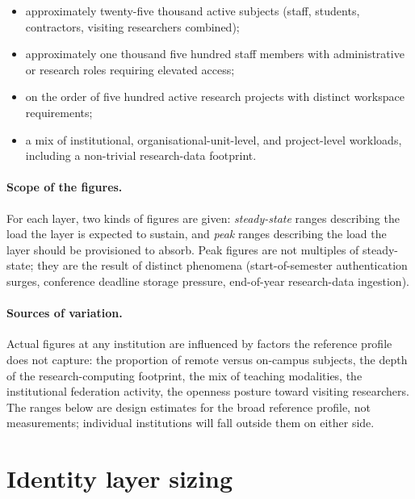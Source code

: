 \begin{itemize}[leftmargin=1.5em,nosep]
  \item approximately twenty-five thousand active subjects (staff,
    students, contractors, visiting researchers combined);
  \item approximately one thousand five hundred staff members with
    administrative or research roles requiring elevated access;
  \item on the order of five hundred active research projects with
    distinct workspace requirements;
  \item a mix of institutional, organisational-unit-level, and
    project-level workloads, including a non-trivial research-data
    footprint.
\end{itemize}

\paragraph{Scope of the figures.} For each layer, two kinds of
figures are given: \emph{steady-state} ranges describing the load
the layer is expected to sustain, and \emph{peak} ranges describing
the load the layer should be provisioned to absorb. Peak figures are
not multiples of steady-state; they are the result of distinct
phenomena (start-of-semester authentication surges, conference
deadline storage pressure, end-of-year research-data ingestion).

\paragraph{Sources of variation.} Actual figures at any institution
are influenced by factors the reference profile does not capture:
the proportion of remote versus on-campus subjects, the depth of
the research-computing footprint, the mix of teaching modalities,
the institutional federation activity, the openness posture toward
visiting researchers. The ranges below are design estimates for the
broad reference profile, not measurements; individual institutions
will fall outside them on either side.

\section{Identity layer sizing}
\label{sec:sz-identity}

